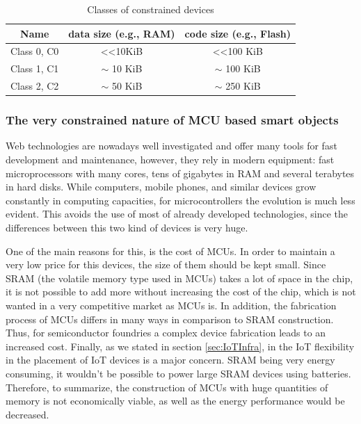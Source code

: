 \begin{table}[htb]
	\centering
	\caption{Classes of constrained devices}
	\label{tab:DeviceClass}
	\begin{tabular}{|c|c|c|}
		\hline
		Name        & data size (e.g., RAM)    & code size (e.g., Flash)    \\ \hline
		Class 0, C0 & \textless\textless 10KiB & \textless\textless 100 KiB \\ \hline
		Class 1, C1 & $\sim$ 10 KiB                 & $\sim$ 100 KiB                  \\ \hline
		Class 2, C2 & $\sim$ 50 KiB                 & $\sim$ 250 KiB                  \\ \hline
	\end{tabular}
\end{table}



\subsubsection{The very constrained nature of MCU based smart objects}
Web technologies are nowadays well investigated and offer many tools for fast development and maintenance, however, they rely in modern equipment: fast microprocessors with many cores, tens of gigabytes in RAM and several terabytes in hard disks.
While computers, mobile phones, and similar devices grow constantly in computing capacities, for microcontrollers the evolution is much less evident.
This avoids the use of most of already developed technologies, since the differences between this two kind of devices is very huge.

One of the main reasons for this, is the cost of MCUs.
In order to maintain a very low price for this devices, the size of them should be kept small.
Since SRAM (the volatile memory type used in MCUs) takes a lot of space in the chip, it is not possible to add more without increasing the cost of the chip, which is not wanted in a very competitive market as MCUs is.
In addition, the fabrication process of MCUs differs in many ways in comparison to SRAM construction.
Thus, for semiconductor foundries a complex device fabrication leads to an increased cost.
Finally, as we stated in section \ref{sec:IoTInfra}, in the IoT flexibility in the placement of IoT devices is a major concern.
SRAM being very energy consuming, it wouldn't be possible to power large SRAM devices using batteries.
Therefore, to summarize, the construction of MCUs with huge quantities of memory is not economically viable, as well as the energy performance would be decreased.

